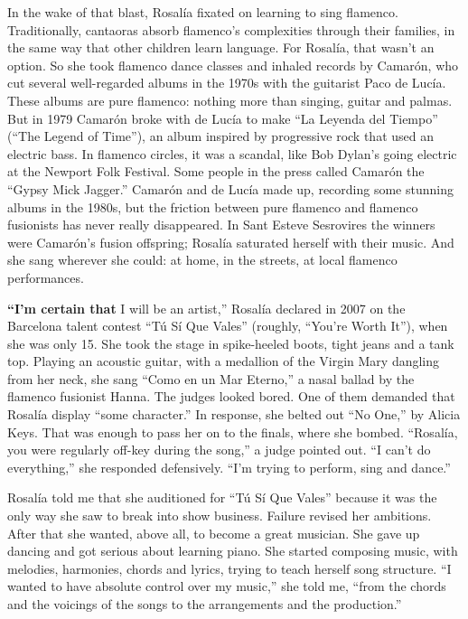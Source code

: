 In the wake of that blast, Rosalía fixated on learning to sing flamenco.
Traditionally, cantaoras absorb flamenco's complexities through their
families, in the same way that other children learn language. For
Rosalía, that wasn't an option. So she took flamenco dance classes and
inhaled records by Camarón, who cut several well-regarded albums in the
1970s with the guitarist Paco de Lucía. These albums are pure flamenco:
nothing more than singing, guitar and palmas. But in 1979 Camarón broke
with de Lucía to make ``La Leyenda del Tiempo'' (``The Legend of
Time''), an album inspired by progressive rock that used an electric
bass. In flamenco circles, it was a scandal, like Bob Dylan's going
electric at the Newport Folk Festival. Some people in the press called
Camarón the ``Gypsy Mick Jagger.'' Camarón and de Lucía made up,
recording some stunning albums in the 1980s, but the friction between
pure flamenco and flamenco fusionists has never really disappeared. In
Sant Esteve Sesrovires the winners were Camarón's fusion offspring;
Rosalía saturated herself with their music. And she sang wherever she
could: at home, in the streets, at local flamenco performances.

\textbf{``I'm certain that} I will be an artist,'' Rosalía declared in
2007 on the Barcelona talent contest ``Tú Sí Que Vales'' (roughly,
``You're Worth It''), when she was only 15. She took the stage in
spike-heeled boots, tight jeans and a tank top. Playing an acoustic
guitar, with a medallion of the Virgin Mary dangling from her neck, she
sang ``Como en un Mar Eterno,'' a nasal ballad by the flamenco fusionist
Hanna. The judges looked bored. One of them demanded that Rosalía
display ``some character.'' In response, she belted out ``No One,'' by
Alicia Keys. That was enough to pass her on to the finals, where she
bombed. ``Rosalía, you were regularly off-key during the song,'' a judge
pointed out. ``I can't do everything,'' she responded defensively. ``I'm
trying to perform, sing and dance.''

Rosalía told me that she auditioned for ``Tú Sí Que Vales'' because it
was the only way she saw to break into show business. Failure revised
her ambitions. After that she wanted, above all, to become a great
musician. She gave up dancing and got serious about learning piano. She
started composing music, with melodies, harmonies, chords and lyrics,
trying to teach herself song structure. ``I wanted to have absolute
control over my music,'' she told me, ``from the chords and the voicings
of the songs to the arrangements and the production.''


